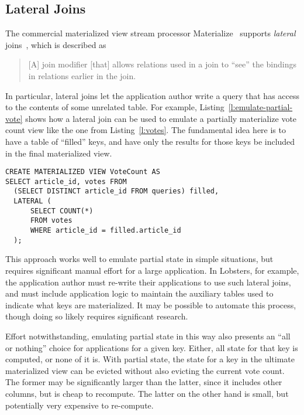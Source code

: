 \subsection{Lateral Joins}

The commercial materialized view stream processor Materialize~\cite{materialize}
supports \emph{lateral} joins~\cite{lateral-join}, which is described as

\begin{quote}
  [A] join modifier [that] allows relations used in a join to ``see'' the
  bindings in relations earlier in the join.
\end{quote}

In particular, lateral joins let the application author write a query that has
access to the contents of some unrelated table. For example,
Listing~\ref{l:emulate-partial-vote} shows how a lateral join can be used to
emulate a partially materialize vote count view like the one from
Listing~\ref{l:votes}. The fundamental idea here is to have a table of
``filled'' keys, and have only the results for those keys be included in the
final materialized view.

\begin{listing}[h]
  \begin{verbatim}
CREATE MATERIALIZED VIEW VoteCount AS
SELECT article_id, votes FROM
  (SELECT DISTINCT article_id FROM queries) filled,
  LATERAL (
      SELECT COUNT(*)
      FROM votes
      WHERE article_id = filled.article_id
  );
  \end{verbatim}
  \caption{Using a lateral join to emulate partial state in vote.}
  \label{l:emulate-partial-vote}
\end{listing}

This approach works well to emulate partial state in simple situations, but
requires significant manual effort for a large application. In Lobsters, for
example, the application author must re-write their applications to use such
lateral joins, and must include application logic to maintain the auxiliary
tables used to indicate what keys are materialized. It may be possible to
automate this process, though doing so likely requires significant research.

Effort notwithstanding, emulating partial state in this way also presents an
``all or nothing'' choice for applications for a given key. Either, all state
for that key is computed, or none of it is. With partial state, the state for a
key in the ultimate materialized view can be evicted without also evicting the
current vote count. The former may be significantly larger than the latter,
since it includes other columns, but is cheap to recompute. The latter on the
other hand is small, but potentially very expensive to re-compute.

